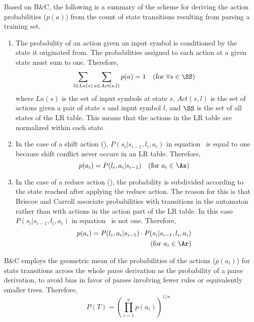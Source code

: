 Based on B\&C, the following is a summary of the scheme for
deriving the action probabilities ($p(a)$) from the count of state
transitions resulting from parsing a training set.
\begin{enumerate}
\item The probability of an action given an input symbol is
  conditioned by the state it originated from. The probabilities
  assigned to each action at a given state must sum to
  one. Therefore,
  \begin{equation}
    \label{eq:b&c-act}
    \sum_{l\in La(s)}\sum_{a\in Act(s,l)} p(a)=1
    \quad\mbox{(for $\forall s\in\SS$)}
  \end{equation}
  where $La(s)$ is the set of input symbols at state $s$, $Act(s,l)$ is
  the set of actions given a pair of state $s$ and input symbol $l$, 
  and $\SS$ is the set of all states of the LR table. This means that
  the actions in the LR table are normalized within each state.
\item In the case of a shift action (\As),
  $P(s_i|s_{i-1},l_i,a_i)$ in equation~ is equal to one
  because shift conflict never occurs in an LR table. Therefore,
  \begin{equation}
    \label{eq:b&c-sh}
    p(a_i)=P(l_i,a_i|s_{i-1})
    \quad\mbox{(for $a_i \in \As$)}
  \end{equation}
\item In the case of a reduce action (\Ar), the
  probability is subdivided according to the state reached after
  applying the reduce action. The reason for this is that Briscoe and
  Carroll associate probabilities with transitions in the automaton
  rather than with actions in the action part of the LR table. In this
  case $P(s_i|s_{i-1},l_i,a_i)$ in equation~ is not
  one. Therefore,
  \begin{eqnarray}
    \label{eq:b&c-re}
    \nonumber
    p(a_i)=P(l_i,a_i|s_{i-1}) \cdot P(s_i|s_{i-1},l_i,a_i) \\
    \mbox{(for $a_i \in \Ar$)}
  \end{eqnarray}
\end{enumerate}

B\&C employs the geometric mean of the probabilities of the actions
($p(a_i)$) for state transitions across the whole parse derivation as
the probability of a parse derivation, to avoid bias in favor of parses
involving fewer rules or equivalently smaller trees. Therefore,
\begin{equation}
  \label{eq:b&c-tree}
  P(T) = (\prod_{i=1}^n p(a_i))^{1/n}
\end{equation}

